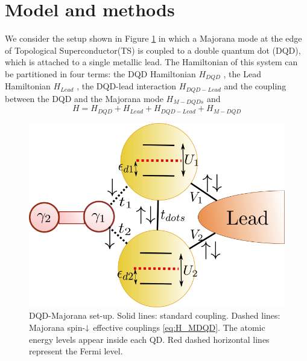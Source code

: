\documentclass[showpacs,aps,prb,reprint,superscriptaddress]{revtex4-1}
\newcommand{\TS}[1]{{$\rightarrow$ {\sl#1}}}
\newcommand{\LUIS}[1]{\textcolor{blue}{\fbox{Luis} {\sl#1}}}
\begin{document}

\section{Model and methods}
\label{sec:modelmethods}





We consider the setup shown in Figure \ref{fig:GenModel} in which a Majorana mode at the edge of Topological Superconductor(TS) is coupled to a double quantum dot (DQD), which is attached to a single metallic lead. The Hamiltonian of this system can be partitioned in four terms: the DQD Hamiltonian $H_{DQD}$ , the Lead Hamiltonian $H_{Lead}$ , the DQD-lead interaction  $H_{DQD-Lead}$ and the coupling between the DQD and the Majorana mode $H_{M-DQDs}$ and   
\begin{equation}
H=H_{DQD}+H_{Lead}+H_{DQD-Lead}+H_{M-DQD} 
\label{eq:Model}
\end{equation}


\begin{figure}[bt]
\begin{center}
\includegraphics[scale=0.4]{Graficos/GenModel.png}
\caption{ DQD-Majorana set-up. Solid lines: standard coupling. Dashed lines: Majorana spin-$\downarrow$ effective couplings \eqref{eq:H_MDQD}. The atomic energy levels appear inside each QD. Red dashed horizontal lines represent the Fermi level.  
}
%
\label{fig:GenModel}
\end{center}
\end{figure}
\end{document}
